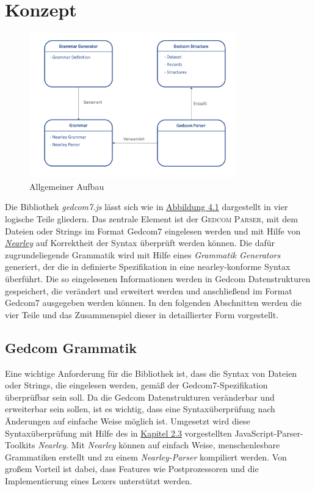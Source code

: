\chapter{Konzept}
\label{chap: Konzept}

\begin{figure}[b]
	\centering
	\includegraphics[width=0.8\textwidth]{images/konzept_allgemein.png}
	\caption{Allgemeiner Aufbau}
	\label{fig: Allgemeiner Aufbau}
\end{figure}

Die Bibliothek \textit{gedcom7.js} lässt sich wie in \hyperref[fig: Allgemeiner Aufbau]{Abbildung 4.1} dargestellt in vier logische Teile gliedern. Das zentrale Element ist der \textsc{Gedcom Parser}, mit dem Dateien oder Strings im Format Gedcom7 eingelesen werden und mit Hilfe von \hyperref[sec: Nearley]{\textit{Nearley}} auf Korrektheit der Syntax überprüft werden können. Die dafür zugrundeliegende Grammatik wird mit Hilfe eines \textit{Grammatik Generators} generiert, der die in \cite{GEDCOM} definierte Spezifikation in eine nearley-konforme Syntax überführt. Die so eingelesenen Informationen werden in Gedcom Datenstrukturen gespeichert, die verändert und erweitert werden und anschließend im Format Gedcom7 ausgegeben werden können. In den folgenden Abschnitten werden die vier Teile und das Zusammenspiel dieser in detaillierter Form vorgestellt.

\section{Gedcom Grammatik}
\label{sec: Konzept - Gedcom Grammatik}
Eine wichtige Anforderung für die Bibliothek ist, dass die Syntax von Dateien oder Strings, die eingelesen werden, gemäß der Gedcom7-Spezifikation überprüfbar sein soll. Da die Gedcom Datenstrukturen veränderbar und erweiterbar sein sollen, ist es wichtig, dass eine Syntaxüberprüfung nach Änderungen auf einfache Weise möglich ist. Umgesetzt wird diese Syntaxüberprüfung mit Hilfe des in \hyperref[sec: Nearley]{Kapitel 2.3} vorgestellten JavaScript-Parser-Toolkits \textit{Nearley}. Mit \textit{Nearley} können auf einfach Weise, menschenlesbare Grammatiken erstellt und zu einem \textit{Nearley-Parser} kompiliert werden. Von großem Vorteil ist dabei, dass Features wie Postprozessoren und die Implementierung eines Lexers unterstützt werden. 

